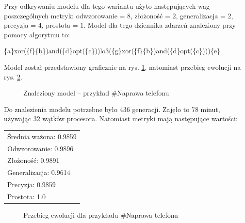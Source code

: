Przy odkrywaniu modelu dla tego wariantu użyto następujących wag poszczególnych metryk: odwzorowanie = 8, złożoność = 2, generalizacja = 2, precyzja = 4, prostota = 1. Model dla tego dziennika zdarzeń znaleziony przy pomocy algorytmu to:
\begin{center}
	\{a\}xor(\{f\}\{b\})and(\{d\}opt(\{c\}))lo3(\{g\}xor(\{f\}\{b\})and(\{d\}opt(\{c\})))\{e\}
\end{center}
Model został przedstawiony graficznie na rys. \ref{fig:p4_model}, natomiast przebieg ewolucji na rys. \ref{fig:p4_chart}.

\begin{figure}[H]
	\caption{\label{fig:p4_model}Znaleziony model -- przykład \#Naprawa telefonu}
\end{figure}

Do znalezienia modelu potrzebne było 436 generacji. Zajęło to 78 minut, używając 32 wątków procesora. Natomiast metryki mają następujące wartości: 

 \begin{center}
  \begin{tabular}{l}
	Średnia ważona: 0.9859 \\
	Odwzorowanie: 0.9896 \\
	Złożoność: 0.9891 \\
	Generalizacja: 0.9614 \\
	Precyzja: 0.9859 \\
	Prostota: 1.0
  \end{tabular}
 \end{center}
 
\begin{figure}[H]
	\caption{\label{fig:p4_chart}Przebieg ewolucji dla przykładu \#Naprawa telefonu}
\end{figure}

